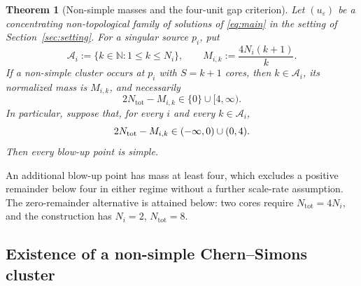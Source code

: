 \documentclass[11pt,reqno]{amsart}
\numberwithin{equation}{section}
\newtheorem{theorem}{Theorem}[section]
\theoremstyle{definition}
\theoremstyle{remark}
\newcommand{\eps}{\varepsilon}
\newcommand{\tot}{\mathrm{tot}}
\begin{document}
\begin{theorem}[Non-simple masses and the four-unit gap criterion]
\label{thm:ratio-free-four-unit-gap}
Let \((u_\eps)\) be a concentrating non-topological family of solutions of
\eqref{eq:main} in the setting of Section~\ref{sec:setting}.
For a singular source $p_i$, put
\[
 \mathscr A_i:=\{k\in\mathbb N:1\le k\le N_i\},
 \qquad
 M_{i,k}:=\frac{4N_i(k+1)}{k}.
\]
If a non-simple cluster occurs at $p_i$ with $S=k+1$ cores, then
$k\in\mathscr A_i$, its normalized mass is $M_{i,k}$, and necessarily
\begin{equation}\label{eq:necessary-alternative}
2N_{\mathrm{tot}}-M_{i,k}\in\{0\}\cup[4,\infty).
\end{equation}
In particular, suppose that, for every $i$ and every $k\in\mathscr A_i$,
\begin{equation}
 2N_{\rm tot}-M_{i,k}\in(-\infty,0)\cup(0,4).
 \label{eq:ratio-free-four-unit-gap}
\end{equation}
Then every blow-up point is simple.  
\end{theorem}

An additional blow-up point has mass at least four, which excludes
a positive remainder below four in either regime without a further
scale-rate assumption. The zero-remainder alternative is attained
below: two cores require $N_{\tot}=4N_i$, and the construction has
$N_i=2$, $N_{\tot}=8$.

\subsection{Existence of a non-simple Chern--Simons cluster}
\end{document}
